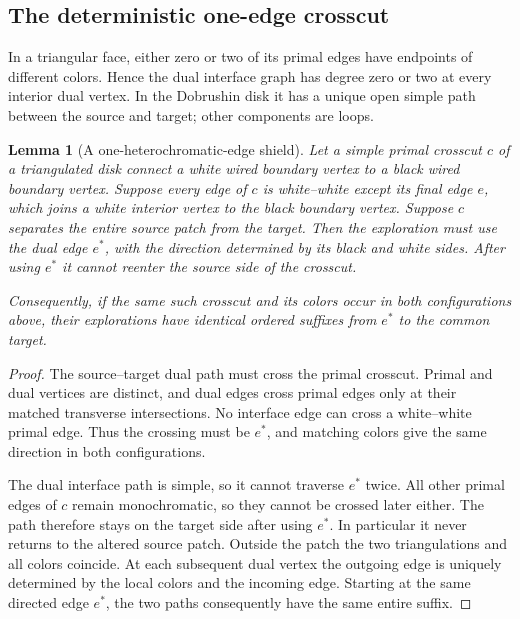 \documentclass[11pt]{article}
\newtheorem{lemma}[theorem]{Lemma}
\theoremstyle{definition}\newtheorem{definition}[theorem]{Definition}
\theoremstyle{remark}\newtheorem{remark}[theorem]{Remark}
\begin{document}
\subsection{The deterministic one-edge crosscut}

In a triangular face, either zero or two of its primal edges have endpoints
of different colors. Hence the dual interface graph has degree zero or two
at every interior dual vertex. In the Dobrushin disk it has a unique open
simple path between the source and target; other components are loops.

\begin{lemma}[A one-heterochromatic-edge shield]
\label{lem:ss-oneedge}
Let a simple primal crosscut $c$ of a triangulated disk connect a white
wired boundary vertex to a black wired boundary vertex. Suppose every
edge of $c$ is white--white except its final edge $e$, which joins a white
\emph{interior} vertex to the black boundary vertex. Suppose $c$ separates
the entire source patch from the target. Then the exploration must use
the dual edge $e^*$, with the direction determined by its black and white
sides. After using $e^*$ it cannot reenter the source side of the crosscut.

Consequently, if the same such crosscut and its colors occur in both
configurations above, their explorations have identical ordered suffixes
from $e^*$ to the common target.
\end{lemma}

\begin{proof}
The source--target dual path must cross the primal crosscut. Primal and
dual vertices are distinct, and dual edges cross primal edges only at
their matched transverse intersections. No interface edge can cross a
white--white primal edge. Thus the crossing must be $e^*$, and matching
colors give the same direction in both configurations.

The dual interface path is simple, so it cannot traverse $e^*$ twice.
All other primal edges of $c$ remain monochromatic, so they cannot be
crossed later either. The path therefore stays on the target side after
using $e^*$. In particular it never returns to the altered source patch.
Outside the patch the two triangulations and all colors coincide.
At each subsequent dual vertex the outgoing edge is uniquely determined
by the local colors and the incoming edge. Starting at the same directed
edge $e^*$, the two paths consequently have the same entire suffix.
\end{proof}
\end{document}
